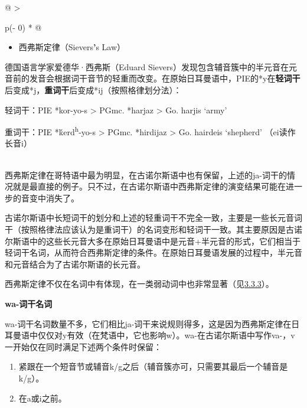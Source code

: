 \begin{longtable}[]{@{}
  >{\raggedright\arraybackslash}p{(\columnwidth - 0\tabcolsep) * }@{}}
\toprule\noalign{}
\begin{minipage}[b]{\linewidth}\raggedright
\begin{itemize}
\item
  西弗斯定律（Sievers\textbf{'}s Law）
\end{itemize}

德国语言学家爱德华·西弗斯（Eduard
Sievers）发现包含辅音簇中的半元音在元音前的发音会根据词干音节的轻重而改变。在原始日耳曼语中，PIE的*y在\textbf{轻词干}后变成*j，\textbf{重词干}后变成*ij（按照格律划分法）：

轻词干：PIE *kor-yo-s \textgreater{} PGmc. *harjaz \textgreater{} Go.
harjis `army'

重词干：PIE *ḱerd\textsuperscript{h}-yo-s \textgreater{} PGmc. *hirdijaz
\textgreater{} Go. hairdeis `shepherd' （ei读作长音i）
\end{minipage} \\
\midrule\noalign{}
\endhead
\bottomrule\noalign{}
\endlastfoot
西弗斯定律在哥特语中最为明显，在古诺尔斯语中也有保留，上述的ja-词干的情况就是最直接的例子。只不过，在古诺尔斯语中西弗斯定律的演变结果可能在进一步的音变中消失了。

古诺尔斯语中长短词干的划分和上述的轻重词干不完全一致，主要是一些长元音词干（按照格律法应该认为是重词干）的名词变形和轻词干一致。其主要原因是古诺尔斯语中的这些长元音大多在原始日耳曼语中是元音+半元音的形式，它们相当于轻词干名词，从而符合西弗斯定律的条件。在原始日耳曼语发展的过程中，半元音和元音结合为了古诺尔斯语的长元音。

西弗斯定律不仅在名词中有体现，在一类弱动词中也非常显著（见\hyperref[ux7b2cux4e00ux5f31ux53d8ux4f4dux6cd5]{3.3.3}）。 \\
\end{longtable}

\textbf{wa-词干名词}

wa-词干名词数量不多，它们相比ja-词干来说规则得多，这是因为西弗斯定律在日耳曼语中仅仅对y有效（在梵语中，它也影响w）。wa-在古诺尔斯语中写作va-，v一开始仅在同时满足下述两个条件时保留：

\begin{enumerate}
\def\labelenumi{\arabic{enumi})}
\item
  紧跟在一个短音节或辅音k/g之后（辅音簇亦可，只需要其最后一个辅音是k/g）。
\item
  在a或i之前。
\end{enumerate}

